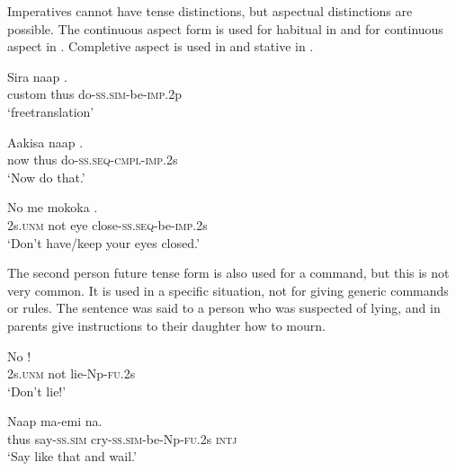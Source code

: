 Imperatives cannot have tense distinctions, but aspectual distinctions are possible. The continuous aspect form is used for habitual in  and for continuous aspect in . Completive aspect is used in  and stative in .

\ea%
\label{ex:7:x1896}
\gll Sira naap . \\
custom thus do-\textsc{ss}.\textsc{sim}-be-\textsc{imp}.2p      \\
\glt `freetranslation'
\z





\ea%
\label{ex:7:x1161}
\gll Aakisa  naap  . \\
now  thus  do-\textsc{ss}.\textsc{seq}-\textsc{cmpl}-\textsc{imp}.2s      \\
\glt `Now do that.'
\z





\ea%
\label{ex:7:x1162}
\gll No  me  mokoka  . \\
2s.\textsc{unm}  not  eye  close-\textsc{ss}.\textsc{seq}-be-\textsc{imp}.2s      \\
\glt `Don't have/keep your eyes closed.'
\z





The second person future tense form is also used for a command, but this is not very common. It is used in a specific situation, not for giving generic commands or rules. The sentence  was said to a person who was suspected of lying, and in  parents give instructions to their daughter how to mourn.

\ea%
\label{ex:7:x1080}
\gll No    ! \\
 2s.\textsc{unm}  not  lie-Np-\textsc{fu}.2s     \\
\glt `Don't lie!'
\z





\ea%
\label{ex:7:x1081}
\gll Naap  ma-emi    na. \\
thus  say-\textsc{ss}.\textsc{sim}  cry-\textsc{ss}.\textsc{sim}-be-Np-\textsc{fu}.2s  \textsc{intj}      \\
\glt `Say like that and wail.'
\z






